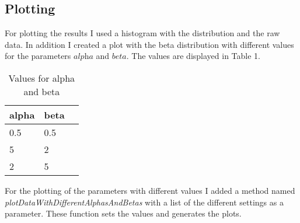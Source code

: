 \documentclass[10pt, a4paper, twocolumn]{article} %
\begin{document}
\subsection{Plotting}
For plotting the results I used a histogram with the distribution and the raw data. In addition I created a plot with the beta distribution with different values for the parameters $\textit{alpha}$ and $\textit{beta}$. The values are displayed in Table 1. 
\begin{table}[htbp]
    \label{tab:alphaBetaParameters}
	\caption{Values for alpha and beta}
	\centering
	\begin{tabular}{llr}
		\cmidrule(r){1-2}
		alpha & beta \\
		\midrule
		0.5 & 0.5 \\
		5 & 2 \\
		2 & 5 \\
		\bottomrule
	\end{tabular}
\end{table}
For the plotting of the parameters with different values I added a method named \textit{plotDataWithDifferentAlphasAndBetas} with a list of the different settings as a parameter. These function sets the values and generates the plots. 
\end{document}

